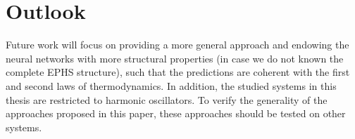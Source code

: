 \documentclass[
	parskip, 			   %
	twoside, 			   %
	DIV=14, 			   %
	BCOR=15.0mm, 		   %
	headsepline, 		   %
	open=right, 		   %
	captions=tableheading, %
	bibliography=totoc,    %
	numbers=noenddot       %
]{scrreprt}
\begin{document}
\section{Outlook}
Future work will focus on providing a more general approach and endowing the neural networks with more structural properties (in case we do not known the complete EPHS structure), such that the predictions are coherent with the first and second laws of thermodynamics. In addition, the studied systems in this thesis are restricted to harmonic oscillators. To verify the generality of the approaches proposed in this paper, these approaches should be tested on other systems.




\renewcommand{\bibname}{References} %



\appendix
\end{document}
